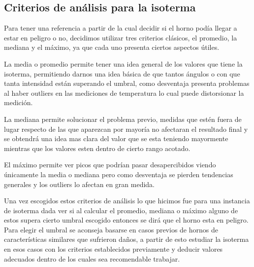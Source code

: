 


\subsection{Criterios de análisis para la isoterma}
 Para tener una referencia a partir de la cual decidir si el horno podía llegar a estar en peligro o no, decidimos utilizar tres criterios clásicos, el promedio, la mediana y el máximo, ya que cada uno presenta ciertos aspectos útiles.
 
  La media o promedio permite tener una idea general de los valores que tiene la isoterma, permitiendo darnos una idea básica de que tantos ángulos o con que tanta intensidad están superando el umbral, como desventaja presenta problemas al haber outliers en las mediciones de temperatura lo cual puede distorsionar la medición.
 
  La mediana permite solucionar el problema previo, medidas que estén fuera de lugar respecto de las que aparezcan por mayoría no afectaran el resultado final y se obtendrá una idea mas clara del valor que se esta teniendo mayormente mientras que los valores esten dentro de cierto rango acotado.
  
   El máximo permite ver picos que podrían pasar desapercibidos viendo únicamente la media o mediana pero como desventaja se pierden tendencias generales y los outliers lo afectan en gran medida.

Una vez escogidos estos criterios de análisis lo que hicimos fue para una instancia de isoterma dada ver si al calcular el promedio, mediana o máximo alguno de estos supera cierto umbral escogido entonces se dirá que el horno esta en peligro. Para elegir el umbral se aconseja basarse en casos previos de hornos de características similares que sufrieron daños, a partir de esto estudiar la isoterma en esos casos con los criterios establecidos previamente y deducir valores adecuados dentro de los cuales sea recomendable trabajar.

